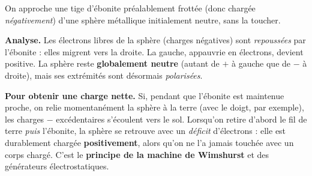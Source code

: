 \documentclass[11pt,a4paper]{article}
\begin{document}
\begin{exemple}
On approche une tige d'ébonite préalablement frottée (donc chargée \emph{négativement}) d'une
sphère métallique initialement neutre, sans la toucher.

\smallskip
\begin{center}
\end{center}

\textbf{Analyse.} Les électrons libres de la sphère (charges négatives) sont \emph{repoussées} par
l'ébonite : elles migrent vers la droite. La gauche, appauvrie en électrons, devient positive. La
sphère reste \textbf{globalement neutre} (autant de $+$ à gauche que de $-$ à droite), mais ses
extrémités sont désormais \emph{polarisées}.

\textbf{Pour obtenir une charge nette.} Si, pendant que l'ébonite est maintenue proche, on relie
momentanément la sphère à la terre (avec le doigt, par exemple), les charges $-$ excédentaires
s'écoulent vers le sol. Lorsqu'on retire d'abord le fil de terre \emph{puis} l'ébonite, la sphère
se retrouve avec un \emph{déficit} d'électrons : elle est durablement chargée \textbf{positivement},
alors qu'on ne l'a jamais touchée avec un corps chargé. C'est le \textbf{principe de la machine de
Wimshurst} et des générateurs électrostatiques.
\end{exemple}
\end{document}
